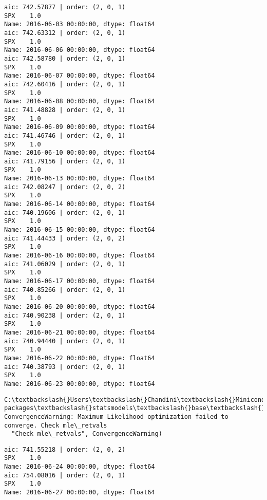 \documentclass[11pt]{article}
\begin{document}
    \begin{Verbatim}[commandchars=\\\{\}]
aic: 742.57877 | order: (2, 0, 1)
SPX    1.0
Name: 2016-06-03 00:00:00, dtype: float64
aic: 742.63312 | order: (2, 0, 1)
SPX    1.0
Name: 2016-06-06 00:00:00, dtype: float64
aic: 742.58780 | order: (2, 0, 1)
SPX    1.0
Name: 2016-06-07 00:00:00, dtype: float64
aic: 742.60416 | order: (2, 0, 1)
SPX    1.0
Name: 2016-06-08 00:00:00, dtype: float64
aic: 741.48828 | order: (2, 0, 1)
SPX    1.0
Name: 2016-06-09 00:00:00, dtype: float64
aic: 741.46746 | order: (2, 0, 1)
SPX    1.0
Name: 2016-06-10 00:00:00, dtype: float64
aic: 741.79156 | order: (2, 0, 1)
SPX    1.0
Name: 2016-06-13 00:00:00, dtype: float64
aic: 742.08247 | order: (2, 0, 2)
SPX    1.0
Name: 2016-06-14 00:00:00, dtype: float64
aic: 740.19606 | order: (2, 0, 1)
SPX    1.0
Name: 2016-06-15 00:00:00, dtype: float64
aic: 741.44433 | order: (2, 0, 2)
SPX    1.0
Name: 2016-06-16 00:00:00, dtype: float64
aic: 741.06029 | order: (2, 0, 1)
SPX    1.0
Name: 2016-06-17 00:00:00, dtype: float64
aic: 740.85266 | order: (2, 0, 1)
SPX    1.0
Name: 2016-06-20 00:00:00, dtype: float64
aic: 740.90238 | order: (2, 0, 1)
SPX    1.0
Name: 2016-06-21 00:00:00, dtype: float64
aic: 740.94440 | order: (2, 0, 1)
SPX    1.0
Name: 2016-06-22 00:00:00, dtype: float64
aic: 740.38793 | order: (2, 0, 1)
SPX    1.0
Name: 2016-06-23 00:00:00, dtype: float64

    \end{Verbatim}

    \begin{Verbatim}[commandchars=\\\{\}]
C:\textbackslash{}Users\textbackslash{}Chandini\textbackslash{}Miniconda3\textbackslash{}envs\textbackslash{}auquan\textbackslash{}lib\textbackslash{}site-packages\textbackslash{}statsmodels\textbackslash{}base\textbackslash{}model.py:496: ConvergenceWarning: Maximum Likelihood optimization failed to converge. Check mle\_retvals
  "Check mle\_retvals", ConvergenceWarning)

    \end{Verbatim}

    \begin{Verbatim}[commandchars=\\\{\}]
aic: 741.55218 | order: (2, 0, 2)
SPX    1.0
Name: 2016-06-24 00:00:00, dtype: float64
aic: 754.08016 | order: (2, 0, 1)
SPX    1.0
Name: 2016-06-27 00:00:00, dtype: float64

    \end{Verbatim}
\end{document}
